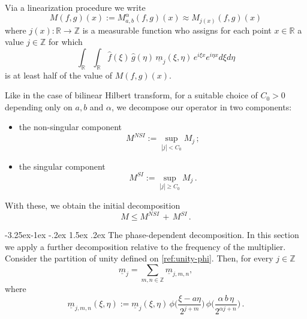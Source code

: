 \documentclass[a4paper,reqno]{amsart}
\makeatletter
\def\subsection{\@startsection{subsection}{2}{\z@}%
	{-3.25ex\@plus -1ex \@minus -.2ex}%
	{1.5ex \@plus .2ex}%
	{\normalfont\bfseries\boldmath}}
\numberwithin{equation}{section}
\theoremstyle{definition}
\newcommand{\R}{\mathbb{R}}
\newcommand{\Z}{\mathbb{Z}}
\newcommand{\jx}{j(x)}
\newcommand{\um}{\underline{m}}
\def\a{\alpha}
\makeatother
\begin{document}
Via a linearization procedure we write
\begin{equation*}
	M(f,g)(x):=M_{a,b}^\a(f,g)(x)\approx M_{\jx}(f,g)(x)
\end{equation*}
where $\jx:\R\to\Z$ is a measurable function who assigns for each point $x\in\R$ a value $j\in \Z$ for which
\[
\int_\R\int_\R \hat{f}(\xi)\,\hat{g}(\eta)\,\um_j(\xi,\eta)\,e^{i\xi x}e^{i\eta x}d\xi d\eta
\]
is at least half of the value of $M(f,g)(x)$.

Like in the case of bilinear Hilbert transform, for a suitable choice of $C_0>0$ depending only on $a,b$ and $\a$, we decompose our operator in two components:
\begin{itemize}
	\item the non-singular component
	\begin{equation*}
		M^{NSI}:=\sup_{|j|<C_0} M_j\,;
	\end{equation*}
	\item the singular component
	\begin{equation*}\label{sing-m}
		M^{SI}:=\sup_{|j|\geq C_0} M_j\,.
	\end{equation*}
\end{itemize}

With these, we obtain the initial decomposition
\begin{equation*}
	M\le M^{NSI}\,+\,M^{SI}\,.
\end{equation*}


\subsection{The phase-dependent decomposition.} In this section we apply a further decomposition relative to the frequency of the multiplier. Consider the partition of unity defined on \eqref{ref:unity-phi}. Then, for every $j\in\Z$
\begin{equation*}
	\um_j=\sum_{m,n\in\Z} \um_{j,m,n},
\end{equation*}
where
\begin{equation}\label{mjmnM}
	\um_{j,m,n}(\xi,\eta):=\um_j(\xi,\eta)\,\phi\Big(\frac{\xi-a\eta}{2^{j+m}}\Big)\,\phi\Big(\frac{\a\,b\,\eta}{2^{\a j+n}}\Big)\,.
\end{equation}
\end{document}
